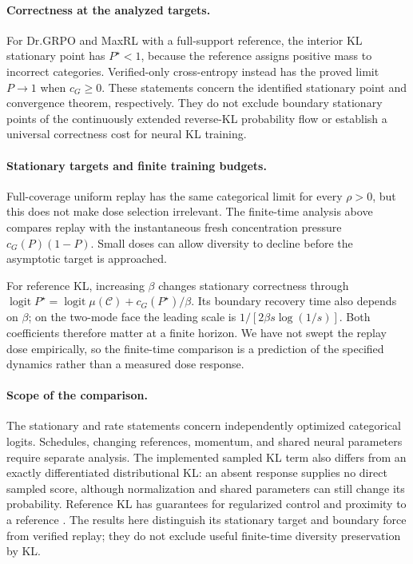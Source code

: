 \documentclass{article}
\newcommand{\1}{\mathbf 1}
\theoremstyle{remark}
\theoremstyle{definition}
\theoremstyle{plain}
\begin{document}
\paragraph{Correctness at the analyzed targets.}
For Dr.GRPO and MaxRL with a full-support reference, the interior KL
stationary point has $P^\star<1$, because the reference assigns positive
mass to incorrect categories. Verified-only cross-entropy instead has the
proved limit $P\to1$ when $c_G\ge0$. These statements concern the identified
stationary point and convergence theorem, respectively. They do not exclude
boundary stationary points of the continuously extended reverse-KL
probability flow or establish a universal correctness cost for neural KL
training.

\paragraph{Stationary targets and finite training budgets.}
Full-coverage uniform replay has the same categorical limit for every
$\rho>0$, but this does not make dose selection irrelevant.
The finite-time analysis above compares replay with the instantaneous
fresh concentration pressure $c_G(P)(1-P)$. Small doses can allow diversity
to decline before the asymptotic target is approached.

For reference KL, increasing $\beta$ changes stationary correctness through
$\operatorname{logit}P^\star=\operatorname{logit}\mu(\mathcal C)+c_G(P^\star)/\beta$.
Its boundary recovery time also depends on $\beta$; on the two-mode face
the leading scale is $1/[2\beta s\log(1/s)]$.
Both coefficients therefore matter at a finite horizon. We have not swept
the replay dose empirically, so the finite-time comparison is a prediction of
the specified dynamics rather than a measured dose response.

\paragraph{Scope of the comparison.}
The stationary and rate statements concern independently optimized
categorical logits. Schedules, changing references, momentum, and shared
neural parameters require separate analysis. The implemented sampled KL
term also differs from an exactly differentiated distributional KL:
an absent response supplies no direct sampled score, although normalization
and shared parameters can still change its probability.
Reference KL has guarantees for regularized control and proximity to a
reference \citep{geist2019regmdp,vieillard2020kl}. The results here distinguish
its stationary target and boundary force from verified replay; they do not
exclude useful finite-time diversity preservation by KL.
\end{document}
